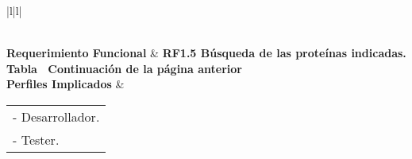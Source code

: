 \begin{longtable}{|l|l|}
\caption{Prueba unitaria RF1.5}
\label{PU_RF1_5}\\
\hline
\textbf{Requerimiento Funcional}                                                       & \textbf{RF1.5 Búsqueda de las proteínas indicadas.}                                                                                                                                                                                                                                                                                                                                                                                                                                                                                                                                                                                                                                                                                                                                                                                                                                                                                                                                       \\ \hline
\endfirsthead
%
%
{{\bfseries Tabla \thetable\ Continuación de la página anterior}} \\
\endhead
%
\textbf{Perfiles Implicados}                                                           & \begin{tabular}[c]{@{}l@{}}- Desarrollador.\\ - Tester.\end{tabular}                                                                                                                                                                                                                                                                                                                                                                                                                                                                                                                                                                                                                                                                                                                                                                                                                                                                                                                      \\ \hline

\end{longtable}
